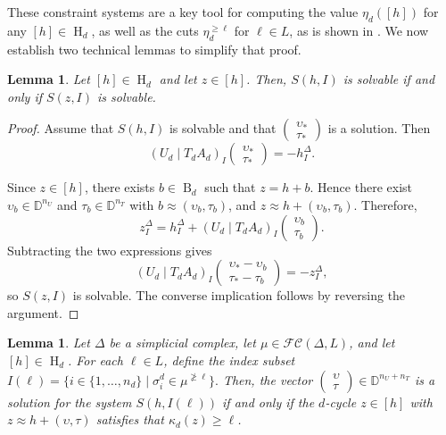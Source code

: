 \documentclass[a4paper,10pt]{article}
\newtheorem{lemma}[theorem]{Lemma}
\newcommand{\bbd}{\mathbb{D}}
\newcommand{\calfc}{\mathcal{FC}}
\DeclareMathOperator{\Bo}{B}
\DeclareMathOperator{\Ho}{H}
\begin{document}
These constraint systems are a key tool for computing the value \(\eta_d([h])\) for any \([h] \in \Ho_d\), as well as the cuts \(\eta_d^{\geq \ell}\) for \(\ell \in L\), as is shown in . We now establish two technical lemmas to simplify that proof.

\begin{lemma}
\label{lem:shi_welldefined}
Let \([h] \in \Ho_d\) and let \(z \in [h]\). Then, \(S(h,I)\) is solvable if and only if \(S(z,I)\) is solvable.
\end{lemma}

\begin{proof}
Assume that \(S(h,I)\) is solvable and that 
\(\left(
\begin{array}{c}
\upsilon_* \\
\tau_*
\end{array}
\right)\) is a solution. Then
\[
(U_d \mid T_dA_d)_I
\left(
\begin{array}{c}
\upsilon_* \\
\tau_*
\end{array}
\right)
=
-h_I^\Delta .
\]

Since \(z\in[h]\), there exists \(b\in \Bo_d\) such that \(z=h+b\). Hence there exist 
\(\upsilon_b\in\bbd^{n_U}\) and \(\tau_b\in\bbd^{n_T}\) with 
\(b\approx(\upsilon_b,\tau_b)\), and \(z \approx h + (\upsilon_b,\tau_b)\). Therefore,
\[
z_I^\Delta
=
h_I^\Delta
+
(U_d\mid T_dA_d)_I
\left(
\begin{array}{c}
\upsilon_b\\
\tau_b
\end{array}
\right).
\]
Subtracting the two expressions gives
\[
(U_d\mid T_dA_d)_I
\left(
\begin{array}{c}
\upsilon_*-\upsilon_b\\
\tau_*-\tau_b
\end{array}
\right)
=
-z_I^\Delta ,
\]
so \(S(z,I)\) is solvable. The converse implication follows by reversing the argument.
\end{proof}

\begin{lemma}
\label{lem:threshold_system}
Let \(\Delta\) be a simplicial complex, let \(\mu \in \calfc(\Delta,L)\), and let \([h] \in \Ho_d\). For each \(\ell \in L\),
define the index subset
\(I(\ell) = \big\{i \in \{1, \ldots, n_d\}\mid \sigma^{d}_{i} \in \mu^{\not\geq \ell}\big\}.\)
Then, the vector 
\(\left( \begin{array}{c} \upsilon \\ \tau \end{array} \right) \in \bbd^{n_U+n_T}\)
is a solution for the system \(S(h, I(\ell))\) if and only if the \(d\)-cycle \(z \in [h]\) with \(z \approx h+(\upsilon,\tau)\) satisfies that \(\kappa_d(z)\geq \ell\).
\end{lemma}
\end{document}
